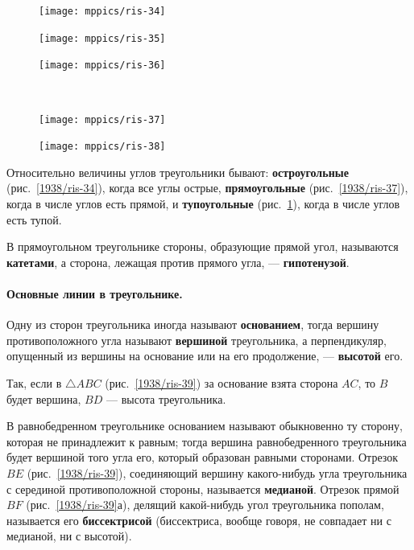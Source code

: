 \documentclass[oneside]{book}
\begin{document}
\begin{figure}[h!]
\begin{minipage}{.32\textwidth}
\centering
\texttt{[image: mppics/ris-34]}
\caption{}\label{1938/ris-34}
\end{minipage}\hfill
\begin{minipage}{.32\textwidth}
\centering
\texttt{[image: mppics/ris-35]}
\caption{}\label{1938/ris-35}
\end{minipage}\hfill
\begin{minipage}{.32\textwidth}
\centering
\texttt{[image: mppics/ris-36]}
\caption{}\label{1938/ris-36}
\end{minipage}
\\
\begin{minipage}{.48\textwidth}
\centering
\texttt{[image: mppics/ris-37]}
\caption{}\label{1938/ris-37}
\end{minipage}
\hfill
\begin{minipage}{.48\textwidth}
\centering
\texttt{[image: mppics/ris-38]}
\caption{}\label{1938/ris-38}
\end{minipage}
\end{figure}

Относительно величины углов треугольники бывают:
\textbf{остроугольные} (рис.~\ref{1938/ris-34}), когда все углы острые, \textbf{прямоугольные} (рис.~\ref{1938/ris-37}), когда в числе углов есть прямой, и \textbf{тупоугольные} (рис.~\ref{1938/ris-38}), когда в числе углов есть тупой.

В прямоугольном треугольнике стороны, образующие прямой угол, называются \textbf{катетами}, а сторона, лежащая против прямого угла, — \textbf{гипотенузой}.

\paragraph{Основные линии в треугольнике.}\label{1938/36}
Одну из сторон треугольника иногда называют \textbf{основанием}, тогда вершину противоположного угла называют \textbf{вершиной} треугольника, а перпендикуляр, опущенный из вершины на основание или на его продолжение, — \textbf{высотой} его.

Так, если в $\triangle ABC$ (рис.~\ref{1938/ris-39}) за основание взята сторона $AC$, то $B$ будет вершина, $BD$ — высота треугольника.

В равнобедренном треугольнике основанием называют обыкновенно ту сторону, которая не принадлежит к равным;
тогда вершина равнобедренного треугольника будет вершиной того угла его, который образован равными сторонами.
Отрезок $BE$ (рис.~\ref{1938/ris-39}), соединяющий вершину какого-нибудь угла треугольника с серединой противоположной стороны, называется \textbf{медианой}.
Отрезок прямой $BF$ (рис.~\ref{1938/ris-39}а), делящий какой-нибудь угол треугольника пополам, называется его \textbf{биссектрисой} (биссектриса, вообще говоря, не совпадает ни с медианой, ни с высотой).
\end{document}
